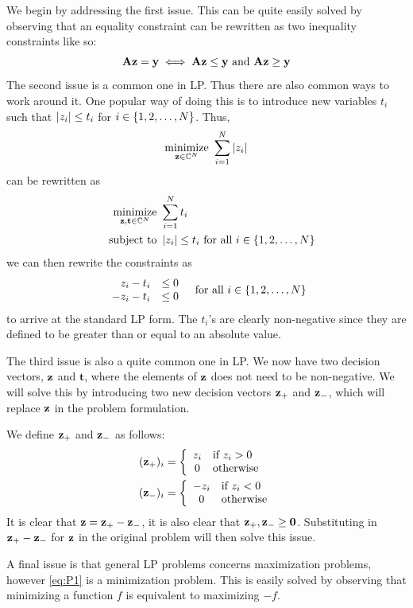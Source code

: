 We begin by addressing the first issue. This can be quite easily solved by observing that an equality constraint can be rewritten as two inequality constraints like so:
\[
	\mathbf{A}\mathbf{z} = \mathbf{y} \iff \mathbf{A}\mathbf{z} \leq \mathbf{y} \text{ and } \mathbf{A}\mathbf{z} \geq \mathbf{y}
\]
The second issue is a common one in LP. Thus there are also common ways to work around it. One popular way of doing this is to introduce new variables $ t_{i} $  such that $ \left|z_{i}\right| \leq t_{i} $ for $ i \in \{1, 2, \ldots, N\} $. Thus, 
\[ 
	\underset{\mathbf{z}\in\mathbb{C}^{N}}{\text{minimize}}~ \sum_{i=1}^{N} \left|z_{i}\right|
\]
can be rewritten as
\begin{align*}
	\underset{\mathbf{z},\mathbf{t} \in \mathbb{C}^{N}}{\text{minimize}}~ & \sum_{i=1}^{N}t_{i} \\
	\quad\operatorname*{subject~to}~ & \left|z_{i}\right| \leq t_{i} \text{ for all } i \in \{1, 2, \ldots, N\}
\end{align*}
we can then rewrite the constraints as
\[
	\begin{array}{r l}
		z_{i} - t_{i} & \leq 0\\
		- z_{i} - t_{i} & \leq 0
	\end{array}
	\quad\text{for all } i \in \{1, 2, \ldots, N\}
\]
to arrive at the standard LP form. The $ t_{i} $'s are clearly non-negative since they are defined to be greater than or equal to an absolute value. 

The third issue is also a quite common one in LP. We now have two decision vectors, $ \mathbf{z}  $ and $ \mathbf{t} $, where the elements of $ \mathbf{z} $ does not need to be non-negative. We will solve this by introducing two new decision vectors $ \mathbf{z}_{+} $ and $ \mathbf{z}_{-} $, which will replace $ \mathbf{z} $ in the problem formulation. 

We define $ \mathbf{z}_{+} $ and $ \mathbf{z}_{-} $ as follows:
\begin{align*}
	(\mathbf{z}_{+})_{i} &= \left\{ \begin{array}{cl} z_{i} & \text{if } z_{i} > 0 \\ 0 & \text{otherwise} \end{array} \right. \\
	(\mathbf{z}_{-})_{i} &= \left\{ \begin{array}{cl} -z_{i} & \text{if } z_{i} < 0 \\ 0 & \text{otherwise} \end{array} \right.
\end{align*}
It is clear that $ \mathbf{z} = \mathbf{z}_{+} - \mathbf{z}_{-} $, it is also clear that $ \mathbf{z}_{+}, \mathbf{z}_{-} \geq \mathbf{0} $. Substituting in $ \mathbf{z}_{+} - \mathbf{z}_{-} $ for $ \mathbf{z} $ in the original problem will then solve this issue. 

A final issue is that general LP problems concerns maximization problems, however \eqref{eq:P1} is a minimization problem. This is easily solved by observing that minimizing a function $ f $ is equivalent to maximizing $ -f $.

